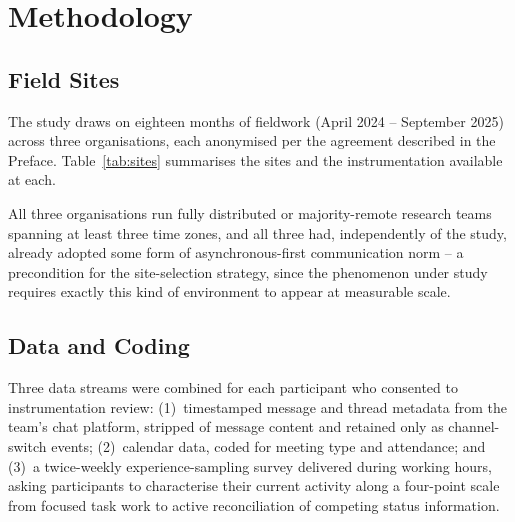 \chapter{Methodology}
\label{ch:methodology}

\section{Field Sites}

The study draws on eighteen months of fieldwork (April 2024 -- September
2025) across three organisations, each anonymised per the agreement
described in the Preface. Table~\ref{tab:sites} summarises the sites and
the instrumentation available at each.

\begin{table}[htbp]
\centering
\small
{}
\caption{Field sites and available instrumentation.}
\label{tab:sites}
\end{table}

All three organisations run fully distributed or majority-remote research
teams spanning at least three time zones, and all three had, independently
of the study, already adopted some form of asynchronous-first
communication norm -- a precondition for the site-selection strategy, since
the phenomenon under study requires exactly this kind of environment to
appear at measurable scale.

\section{Data and Coding}

Three data streams were combined for each participant who consented to
instrumentation review: (1)~timestamped message and thread metadata from
the team's chat platform, stripped of message content and retained only as
channel-switch events; (2)~calendar data, coded for meeting type and
attendance; and (3)~a twice-weekly experience-sampling survey delivered
during working hours, asking participants to characterise their current
activity along a four-point scale from focused task work to active
reconciliation of competing status information.

